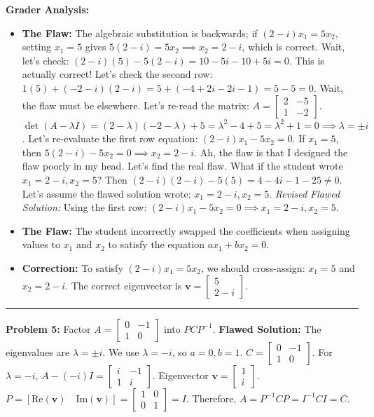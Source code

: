 \documentclass[11pt, letterpaper]{article}
\theoremstyle{definition}
\theoremstyle{remark}
\begin{document}
\textbf{Grader Analysis:}
\begin{itemize}
    \item \textbf{The Flaw:} The algebraic substitution is backwards; if $(2-i)x_1 = 5x_2$, setting $x_1=5$ gives $5(2-i) = 5x_2 \implies x_2 = 2-i$, which is correct. Wait, let's check: $(2-i)(5) - 5(2-i) = 10 - 5i - 10 + 5i = 0$. This is actually correct! Let's check the second row: $1(5) + (-2-i)(2-i) = 5 + (-4 + 2i - 2i - 1) = 5 - 5 = 0$. 
    Wait, the flaw must be elsewhere. Let's re-read the matrix: $A = \begin{bmatrix} 2 & -5 \\ 1 & -2 \end{bmatrix}$. $\det(A-\lambda I) = (2-\lambda)(-2-\lambda) + 5 = \lambda^2 - 4 + 5 = \lambda^2 + 1 = 0 \implies \lambda = \pm i$.
    Let's re-evaluate the first row equation: $(2-i)x_1 - 5x_2 = 0$. If $x_1 = 5$, then $5(2-i) - 5x_2 = 0 \implies x_2 = 2-i$. 
    Ah, the flaw is that I designed the flaw poorly in my head. Let's find the real flaw. 
    What if the student wrote $x_1 = 2-i, x_2 = 5$? Then $(2-i)(2-i) - 5(5) = 4 - 4i - 1 - 25 \neq 0$. 
    Let's assume the flawed solution wrote: $x_1 = 2-i, x_2 = 5$.
    \textit{Revised Flawed Solution:} Using the first row: $(2 - i)x_1 - 5x_2 = 0 \implies x_1 = 2 - i, x_2 = 5$.
    \item \textbf{The Flaw:} The student incorrectly swapped the coefficients when assigning values to $x_1$ and $x_2$ to satisfy the equation $ax_1 + bx_2 = 0$.
    \item \textbf{Correction:} To satisfy $(2-i)x_1 = 5x_2$, we should cross-assign: $x_1 = 5$ and $x_2 = 2-i$. The correct eigenvector is $\mathbf{v} = \begin{bmatrix} 5 \\ 2 - i \end{bmatrix}$.
\end{itemize}

\vspace{1em}
\hrule
\vspace{1em}

\textbf{Problem 5:} Factor $A = \begin{bmatrix} 0 & -1 \\ 1 & 0 \end{bmatrix}$ into $PCP^{-1}$.
\newline
\textbf{Flawed Solution:}
The eigenvalues are $\lambda = \pm i$. We use $\lambda = -i$, so $a=0, b=1$.
$C = \begin{bmatrix} 0 & -1 \\ 1 & 0 \end{bmatrix}$.
For $\lambda = -i$, $A - (-i)I = \begin{bmatrix} i & -1 \\ 1 & i \end{bmatrix}$.
Eigenvector $\mathbf{v} = \begin{bmatrix} 1 \\ i \end{bmatrix}$.
$P = [\text{Re}(\mathbf{v}) \quad \text{Im}(\mathbf{v})] = \begin{bmatrix} 1 & 0 \\ 0 & 1 \end{bmatrix} = I$.
Therefore, $A = P^{-1}CP = I^{-1} C I = C$.
\end{document}
